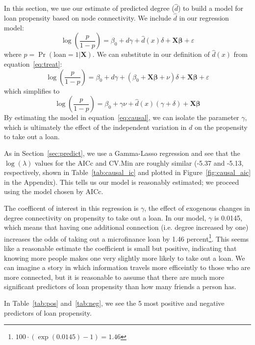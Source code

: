 \documentclass[11pt, fleqn]{article}
\begin{document}
In this section, we use our estimate of predicted degree ($\hat{d}$) to build a model for loan propensity based on node connectivity. We include $\hat{d}$ in our regression model:
\begin{equation} \label{eq:causal}
\log\left(\frac{p}{1-p}\right) = \beta_0 + d \gamma + \hat{d}(x) \delta + \bm{X}\bm{\beta} + \varepsilon
\end{equation}
where $p = \Pr(\text{loan}=1|\bm{X})$. We can substitute in our definition of $\hat{d}(x)$ from equation~\ref{eq:treat}:
\begin{equation}
\log\left(\frac{p}{1-p}\right) = \beta_0 + d \gamma + \left(\beta_0 + \bm{X} \bm{\beta} + \nu\right) \delta + \bm{X}\bm{\beta} + \varepsilon
\end{equation}
which simplifies to
\begin{equation}
\log\left(\frac{p}{1-p}\right) = \beta_0 + \gamma \nu + \hat{d}(x) (\gamma + \delta) + \bm{X}\bm{\beta}
\end{equation}
By estimating the model in equation~\ref{eq:causal}, we can isolate the parameter $\gamma$, which is ultimately the effect of the independent variation in $d$ on the propensity to take out a loan. 

As in Section~\ref{sec:predict}, we use a Gamma-Lasso regression and see that the $\log(\lambda)$ values for the AICc and CV.Min are roughly similar (-5.37 and -5.13, respectively, shown in Table~\ref{tab:causal_ic} and plotted in Figure~\ref{fig:causal_aic} in the Appendix). This tells us our model is reasonably estimated; we proceed using the model chosen by AICc.

The coefficent of interest in this regression is $\gamma$, the effect of exogenous changes in degree connectivity on propensity to take out a loan. In our model, $\gamma$ is 0.0145, which means that having one additional connection (i.e. degree increased by one) increases the odds of taking out a microfinance loan by 1.46 percent\footnote{$100 \cdot \left( \exp(0.0145) - 1 \right) = 1.46$}. This seems like a reasonable estimate \textemdash the coefficient is small but positive, indicating that knowing more people makes one very slightly more likely to take out a loan. We can imagine a story in which information travels more efficeintly to those who are more connected, but it is reasonable to assume that there are much more significant predictors of loan propensity than how many friends a person has.

In Table~\ref{tab:pos} and~\ref{tab:neg}, we see the 5 most positive and negative predictors of loan propensity. 
\end{document}
